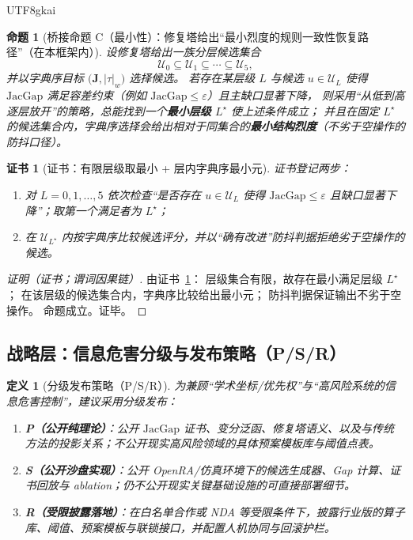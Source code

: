 \documentclass[12pt]{article}
\newtheorem{definition}{定义}[section]
\newtheorem{proposition}{命题}[section]
\newtheorem{Certificate}{证书}[section]
\newcommand{\JacGap}{\ensuremath{\mathrm{JacGap}}} %
\begin{document}
\begin{CJK*}{UTF8}{gkai}
\begin{proposition}[桥接命题 C（最小性）：修复塔给出“最小烈度的规则一致性恢复路径”（在本框架内）]
\label{prop:bridge-c-minimality}
设修复塔给出一族分层候选集合
\[
  \mathcal{U}_0 \subseteq \mathcal{U}_1 \subseteq \cdots \subseteq \mathcal{U}_5,
\]
并以字典序目标 $\bigl(\mathbf{J},|\tau|_w\bigr)$ 选择候选。
若存在某层级 $L$ 与候选 $u\in\mathcal{U}_L$ 使得 $\JacGap$ 满足容差约束（例如 $\JacGap\le \varepsilon$）且主缺口显著下降，
则采用“从低到高逐层放开”的策略，总能找到一个\textbf{最小层级} $L^\star$ 使上述条件成立；
并且在固定 $L^\star$ 的候选集合内，字典序选择会给出相对于同集合的\textbf{最小结构烈度}（不劣于空操作的防抖口径）。
\end{proposition}

\begin{Certificate}[证书：有限层级取最小 + 层内字典序最小元]
\label{cert:bridge-c-minimality}
证书登记两步：
\begin{enumerate}
  \item 对 $L=0,1,\dots,5$ 依次检查“是否存在 $u\in\mathcal{U}_L$ 使得 $\JacGap\le\varepsilon$ 且缺口显著下降”；取第一个满足者为 $L^\star$；
  \item 在 $\mathcal{U}_{L^\star}$ 内按字典序比较候选评分，并以“确有改进”防抖判据拒绝劣于空操作的候选。
\end{enumerate}
\end{Certificate}

\begin{proof}[证明（证书；谓词因果链）]
由证书~\ref{cert:bridge-c-minimality}：
层级集合有限，故存在最小满足层级 $L^\star$；
在该层级的候选集合内，字典序比较给出最小元；
防抖判据保证输出不劣于空操作。
命题成立。证毕。
\end{proof}

\subsection{战略层：信息危害分级与发布策略（P/S/R）}
\label{sec:jacgap-release}

\begin{definition}[分级发布策略（P/S/R）]
\label{def:release-psr}
为兼顾“学术坐标/优先权”与“高风险系统的信息危害控制”，建议采用分级发布：
\begin{enumerate}
  \item \textbf{P（公开纯理论）}：公开 \JacGap{} 证书、变分泛函、修复塔语义、以及与传统方法的投影关系；不公开现实高风险领域的具体预案模板库与阈值点表。
  \item \textbf{S（公开沙盘实现）}：公开 OpenRA/仿真环境下的候选生成器、Gap 计算、证书回放与 ablation；仍不公开现实关键基础设施的可直接部署细节。
  \item \textbf{R（受限披露落地）}：在白名单合作或 NDA 等受限条件下，披露行业版的算子库、阈值、预案模板与联锁接口，并配置人机协同与回滚护栏。
\end{enumerate}
\end{definition}


\end{CJK*}
\end{document}
